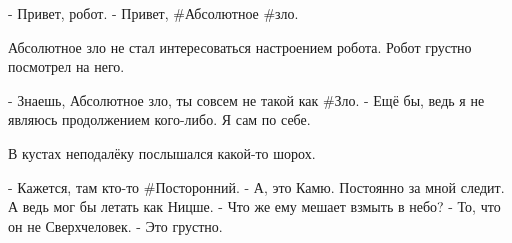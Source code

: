 - Привет, робот.
- Привет, #Абсолютное #зло.

Абсолютное зло не стал интересоваться настроением робота. Робот грустно посмотрел на него.

- Знаешь, Абсолютное зло, ты совсем не такой как #Зло.
- Ещё бы, ведь я не являюсь продолжением кого-либо. Я сам по себе.

В кустах неподалёку послышался какой-то шорох.

- Кажется, там кто-то #Посторонний.
- А, это Камю. Постоянно за мной следит. А ведь мог бы летать как Ницше.
- Что же ему мешает взмыть в небо?
- То, что он не Сверхчеловек.
- Это грустно.